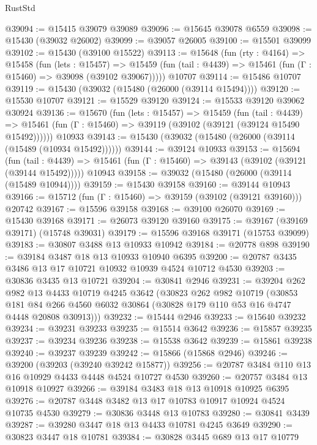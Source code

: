 \begin{lexlean}{RustStd}
\begin{coremodule}
{\begin{coremodule}
{{{{{{{{{{{{{{{{{{{{{{{{{{{{{{{{{{{{{{{{{{{{{{{{{{{{{{{{{{{{@39094 := @15415 @39079 @39089
@39096 := @15645 @39078 @6559
@39098 := @15430 (@39032 @26002)
@39099 := @39057 @26005
@39100 := @15501 @39099
@39102 := @15430 (@39100 @15522)
@39113 := @15648
    (fun (rty : @4164) =>
    @15458
      (fun (lets : @15457) =>
      @15459 (fun (tail : @4439) => @15461 (fun (Γ : @15460) => @39098 (@39102 @39067)))))
    @10707
@39114 := @15486 @10707
@39119 := @15430 (@39032 (@15480 (@26000 (@39114 @15494))))
@39120 := @15530 @10707
@39121 := @15529 @39120
@39124 := @15533 @39120 @39062 @30924
@39136 := @15670
    (fun (lets : @15457) =>
    @15459
      (fun (tail : @4439) =>
      @15461 (fun (Γ : @15460) => @39119 (@39102 (@39121 (@39124 @15490 @15492))))))
    @10933
@39143 := @15430 (@39032 (@15480 (@26000 (@39114 (@15489 (@10934 @15492))))))
@39144 := @39124 @10933
@39153 := @15694
    (fun (tail : @4439) => @15461 (fun (Γ : @15460) => @39143 (@39102 (@39121 (@39144 @15492)))))
    @10943
@39158 := @39032 (@15480 (@26000 (@39114 (@15489 @10944))))
@39159 := @15430 @39158
@39160 := @39144 @10943
@39166 := @15712 (fun (Γ : @15460) => @39159 (@39102 (@39121 @39160))) @20742
@39167 := @15596 @39158
@39168 := @39100 @26070
@39169 := @15430 @39168
@39171 := @26073 @39120 @39160
@39175 := @39167 (@39169 @39171) (@15748 @39031)
@39179 := @15596 @39168 @39171 (@15753 @39099)
@39183 := @30807 @3488 @13 @10933 @10942
@39184 := @20778 @898
@39190 := @39184 @3487 @18 @13 @10933 @10940 @6395
@39200 := @20787 @3435 @3486 @13 @17 @10721 @10932 @10939 @4524 @10712 @4530
@39203 := @30836 @3435 @13 @10721
@39204 := @30841 @2946
@39231 := @39204
    @262
    @982
    @13
    @4433
    @10719
    @4245
    @3642
    (@30823
      @262
      @982
      @10719
      (@30853
        @181
        @84
        @266
        @4560
        @6032
        @30864
        (@30828 @179 @110 @53 @16 @4747 @4448 @20808 @30913)))
@39232 := @15444 @2946
@39233 := @15640 @39232
@39234 := @39231 @39233
@39235 := @15514 @3642
@39236 := @15857 @39235
@39237 := @39234 @39236
@39238 := @15538 @3642
@39239 := @15861 @39238
@39240 := @39237 @39239
@39242 := @15866 (@15868 @2946)
@39246 := @39200 (@39203 (@39240 @39242 @15877))
@39256 := @20787 @3484 @110 @13 @16 @10929 @4433 @4448 @4524 @10727 @4530
@39260 := @20757 @3484 @13 @10918 @10927
@39266 := @39184 @3483 @18 @13 @10918 @10925 @6395
@39276 := @20787 @3448 @3482 @13 @17 @10783 @10917 @10924 @4524 @10735 @4530
@39279 := @30836 @3448 @13 @10783
@39280 := @30841 @3439
@39287 := @39280 @3447 @18 @13 @4433 @10781 @4245 @3649
@39290 := @30823 @3447 @18 @10781
@39384 := @30828
    @3445
    @689
    @13
    @17
    @10779
}}}}}}}}}}}}}}}}}}}}}}}}}}}}}}}}}}}}}}}}}}}}}}}}}}}}}}}}}}}}
\end{coremodule}}
\end{coremodule}
\end{lexlean}
